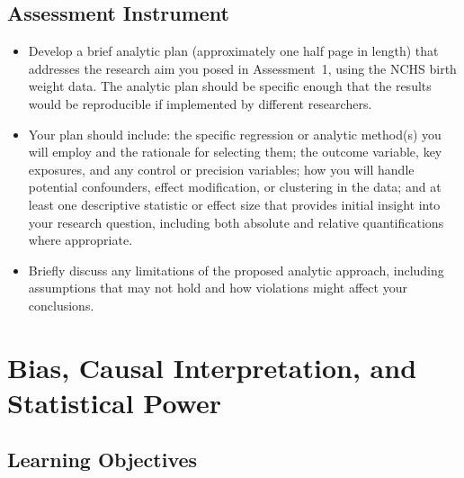 \subsection{Assessment Instrument}

\begin{itemize}
    \item Develop a brief analytic plan (approximately one half page in length) that addresses the research aim you posed in Assessment~1, using the NCHS birth weight data. The analytic plan should be specific enough that the results would be reproducible if implemented by different researchers.
    \item Your plan should include: the specific regression or analytic method(s) you will employ and the rationale for selecting them; the outcome variable, key exposures, and any control or precision variables; how you will handle potential confounders, effect modification, or clustering in the data; and at least one descriptive statistic or effect size that provides initial insight into your research question, including both absolute and relative quantifications where appropriate.
    \item Briefly discuss any limitations of the proposed analytic approach, including assumptions that may not hold and how violations might affect your conclusions.
\end{itemize}

\section{Bias, Causal Interpretation, and Statistical Power}
\label{sec:3.3}

\subsection{Learning Objectives}

